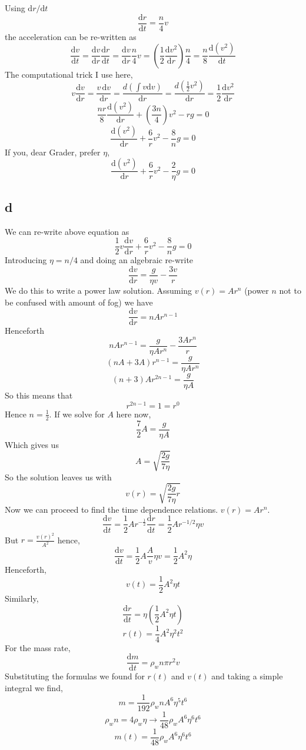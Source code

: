 \documentclass[letter]{article}
\begin{document}
Using $\mathrm{d} r / \mathrm{d} t$ 
\[
\frac{\mathrm{d} r}{\mathrm{d} t} = \frac{n}{4} v
\]
the acceleration can be re-written as 
\[
\frac{\mathrm{d} v}{\mathrm{d} t} = 
\frac{\mathrm{d} v}{\mathrm{d} r} \frac{\mathrm{d} r}{\mathrm{d} t} 
= \frac{\mathrm{d} v}{\mathrm{d} r} \frac{n}{4} v  = \left(\frac{1}{2} \frac{\mathrm{d} v^2}{\mathrm{d} r}\right) \frac{n}{4} = \frac{n}{8} \frac{\mathrm{d} (v^2 )}{\mathrm{d} t}
\] 
The computational trick I use here, 
\[
v \frac{\mathrm{d} v}{\mathrm{d} r} = \frac{v \, \mathrm{d} v}{\mathrm{d}  r} = 
\frac{d \left( \int v \mathrm{d} v\right)}{\mathrm{d}  r} = 
\frac{d \left(\frac{1}{2} v^2 \right)}{ \mathrm{d} r} = \frac{1}{2} \frac{\mathrm{d} v^2}{\mathrm{d} r}
\] 
\[
	\frac{nr}{8} \frac{\mathrm{d} (v^2)}{\mathrm{d} r} + \left(\frac{3n}{4}\right) v^2 - rg = 0
\]
\[
\boxed{
\frac{\mathrm{d} (v^2)}{\mathrm{d} r} + \frac{6}{r} v^2 - \frac{8}{n} g = 0
}\]
If you, dear Grader, prefer $\eta$, 
\[
\boxed{
\frac{\mathrm{d} (v^2)}{\mathrm{d} r} + \frac{6}{r} v^2 - \frac{2}{\eta } g = 0
}
\]
\newpage 
\subsection{d} 
We can re-write above equation as 
\[
\frac{1}{2} v \frac{\mathrm{d} v}{\mathrm{d} r} + \frac{6}{r} v^2 - \frac{8}{n} g = 0
\]
Introducing $\eta  = n / 4$ and doing an algebraic re-write 
\[
	\frac{\mathrm{d} v}{\mathrm{d} r} = \frac{g}{\eta v}  - \frac{3v}{r}
\]
We do this to write a power law solution. Assuming $v(r) = Ar^{n}$ (power $n$ not to be confused with amount of fog) we have
\[
\frac{\mathrm{d} v}{\mathrm{d} r} = n A r^{n-1}
\]
Henceforth 
\[
n A r^{n- 1} = \frac{g}{\eta A r^{n} } - \frac{3 A r^{n}}{r}
\]
\[
	(n A + 3A) r^{n-1} = \frac{g}{\eta A r^{n}}
\] 
\[
	(n+3) A r^{2n - 1} = \frac{g}{\eta A}
\] 
So this means that 
\[
r^{2n - 1} = 1 = r ^{0}
\] 
Hence $ n = \frac{1}{2}$. If we solve for $A$ here now, 
\[
\frac{7}{2} A = \frac{g}{\eta A} 
\]
Which gives us 
\[
\boxed{
A = \sqrt{\frac{2g}{7 \eta}} 
}\]
So the solution leaves us with 
\[\boxed{
v(r) = \sqrt{\frac{2g}{7 \eta} r} 
}\]
Now we can proceed to find the time dependence relations. $v(r) = A r^{n}$. 
\[
\frac{\mathrm{d} v}{\mathrm{d} t} = \frac{1}{2} A r^{-\frac{1}{2}} \frac{\mathrm{d} r}{\mathrm{d} t}	= 
\frac{1}{2} A r^{- 1 / 2} \eta v
\]
But $r = \frac{v(r)^2}{A^2}$ hence, 
\[
\frac{\mathrm{d} v}{\mathrm{d} t} = \frac{1}{2} A \frac{A}{v} \eta v = \frac{1}{2} A^2 \eta
\]
Henceforth, 
\[
\boxed{
v(t) = \frac{1}{2} A^2 \eta t }
\]
Similarly, 
\[
	\frac{\mathrm{d} r}{\mathrm{d} t} = \eta \left(\frac{1}{2} A^2 \eta t\right)
\]
\[
\boxed{
r(t) = \frac{1}{4} A^{2} \eta^2 t^2
}
\] 
For the mass rate, 
\[
\frac{\mathrm{d} m}{ \mathrm{d} t} = \rho_w n \pi r ^2 v  
\]
Substituting the formulas we found for $r(t) $ and $v(t)$ and taking a simple integral we find, 
\[
m = \frac{1}{192} \rho_w n A^{6} \eta ^{5} t ^{6} 
\]
\[
\rho_w n = 4 \rho_w \eta \to \frac{1}{48} \rho_w A ^{6} \eta ^{6} t ^{6}  
\]
\[
\boxed{
m(t) = \frac{1}{48} \rho_w A^{6} \eta ^{6} t ^{6}
}
\]
\newpage 
\end{document}

